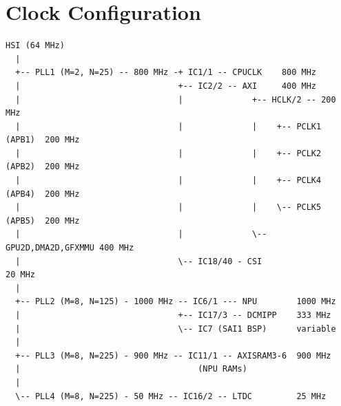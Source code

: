 \section{Clock Configuration}\label{sec:clock}
\begin{lstlisting}[language={}, caption={Microcontroller Clock Konfiguration}, label={lst:clock-configuratiob}]
HSI (64 MHz)
  |
  +-- PLL1 (M=2, N=25) -- 800 MHz -+ IC1/1 -- CPUCLK    800 MHz
  |                                +-- IC2/2 -- AXI     400 MHz
  |                                |              +-- HCLK/2 -- 200 MHz
  |                                |              |    +-- PCLK1 (APB1)  200 MHz
  |                                |              |    +-- PCLK2 (APB2)  200 MHz
  |                                |              |    +-- PCLK4 (APB4)  200 MHz
  |                                |              |    \-- PCLK5 (APB5)  200 MHz
  |                                |              \-- GPU2D,DMA2D,GFXMMU 400 MHz
  |                                \-- IC18/40 - CSI                      20 MHz
  |
  +-- PLL2 (M=8, N=125) - 1000 MHz -- IC6/1 --- NPU        1000 MHz
  |                                +-- IC17/3 -- DCMIPP    333 MHz
  |                                \-- IC7 (SAI1 BSP)      variable
  |
  +-- PLL3 (M=8, N=225) - 900 MHz -- IC11/1 -- AXISRAM3-6  900 MHz
  |                                    (NPU RAMs)
  |
  \-- PLL4 (M=8, N=225) - 50 MHz -- IC16/2 -- LTDC         25 MHz
\end{lstlisting}
